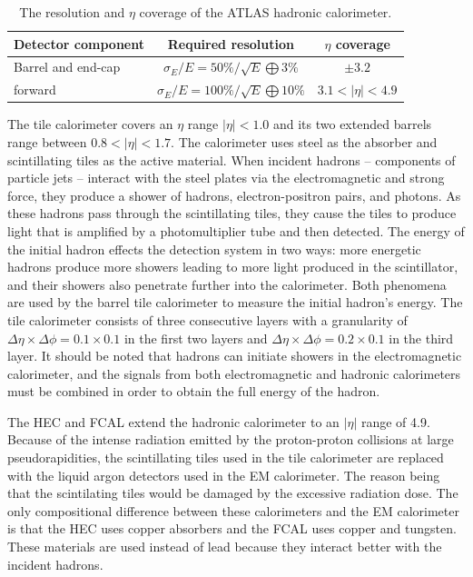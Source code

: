 \begin{table}[htbp]
  \begin{center}
    \begin{tabular}{|l|c|c|}
    \hline
    Detector component & Required resolution & $\eta$ coverage  \\
    \hline
    Barrel and end-cap & $\sigma_E / E = 50\% / \sqrt{E} \bigoplus 3\%$ & $\pm3.2$ \\
    forward & $\sigma_E / E = 100\% / \sqrt{E} \bigoplus 10\%$ & $3.1 < |\eta| < 4.9$ \\
    \hline
    \end{tabular}
    \caption{The resolution and $\eta$ coverage of the ATLAS hadronic calorimeter.}
    \label{tab:calres}
  \end{center}
\end{table}

The tile calorimeter covers an $\eta$ range $|\eta| < 1.0$ and its two
extended barrels range between $0.8 < |\eta| < 1.7$. The calorimeter uses steel
as the absorber and scintillating tiles as the active material. When
incident hadrons -- components of particle jets -- interact with the steel
plates via the electromagnetic and strong force, they produce a shower of hadrons,
electron-positron pairs, and photons. As these hadrons pass through the scintillating 
tiles, they cause the tiles to produce light that is amplified by a photomultiplier
tube and then detected. The energy of the initial hadron effects the detection
system in two ways: more energetic hadrons produce more showers leading to more
light produced in the scintillator, and their showers also penetrate further
into the calorimeter. Both phenomena are used by the barrel tile calorimeter
to measure the initial hadron's energy. The tile calorimeter consists of
three consecutive layers with a granularity of $\Delta\eta \times \Delta\phi =
0.1 \times 0.1$ in the first two layers and $\Delta\eta \times \Delta\phi =
0.2 \times 0.1$ in the third layer. It should be noted that hadrons can initiate
showers in the electromagnetic calorimeter, and the signals from both electromagnetic
and hadronic calorimeters must be combined in order to obtain the full energy of the
hadron.

The HEC and FCAL extend the hadronic calorimeter to an $|\eta|$ range of 4.9. 
Because of the intense radiation emitted by the proton-proton collisions at large
pseudorapidities, the scintillating tiles used in the tile calorimeter are replaced
with the liquid argon detectors used in the EM calorimeter. The reason being that
the scintilating tiles would be damaged by the excessive radiation dose.
The only compositional difference between 
these calorimeters and the EM calorimeter is that the HEC uses copper absorbers
and the FCAL uses copper and tungsten. These materials are used instead of lead
because they interact better with the incident hadrons.

